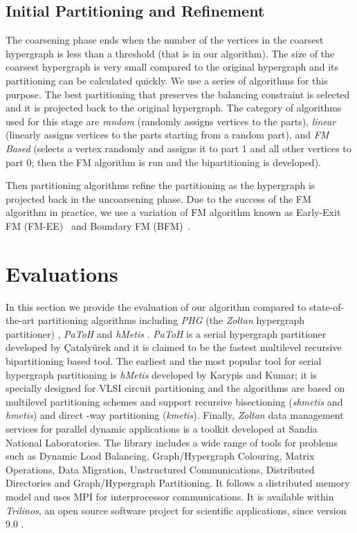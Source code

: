 \documentclass[twocolumn]{svjour3}          \smartqed
\begin{document}
\subsection{Initial Partitioning and Refinement}\label{sec:init_uncoarse}

The coarsening phase ends when the number of the vertices in the coarsest hypergraph is less than a threshold (that is  in our algorithm). The size of the coarsest hypergraph is very small compared to the original hypergraph and its partitioning can be calculated quickly. We use a series of algorithms for this purpose. The best partitioning that preserves the balancing constraint is selected and it is projected back to the original hypergraph. The category of algorithms used for this stage are \textit{random} (randomly assigns vertices to the parts), \textit{linear} (linearly assigns vertices to the parts starting from a random part), and \textit{FM Based} (selects a vertex randomly and assigns it to part 1 and all other vertices to part 0; then the FM algorithm is run and the bipartitioning is developed).

Then partitioning algorithms refine the partitioning as the hypergraph is projected back in the uncoarsening phase. Due to the success of the FM algorithm in practice, we use a variation of FM algorithm known as Early-Exit FM (FM-EE)~\cite{karytech2002} and Boundary FM (BFM)~\cite{ccatalyurek2011patoh}. 


\section{Evaluations}\label{sec:evaluations}

In this section we provide the evaluation of our algorithm compared to state-of-the-art partitioning algorithms including \textit{PHG} (the  \textit{Zoltan} hypergraph partitioner) \cite{devetal2006}, \textit{PaToH} \cite{ccatalyurek2011patoh} and \textit{hMetis} \cite{hmetis15url}. \textit{PaToH} is a serial hypergraph partitioner developed by \c{C}ataly\"{u}rek 
and it is claimed to be the fastest multilevel recursive bipartitioning based tool. The earliest and the most popular tool for serial hypergraph partitioning is \textit{hMetis} developed by Karypis and Kumar; it is specially designed for VLSI circuit partitioning and the algorithms are based on multilevel partitioning schemes and support recursive bisectioning (\textit{shmetis} and  \textit{hmetis}) and direct {-way} partitioning (\textit{kmetis}). Finally, \textit{Zoltan} data management services for parallel dynamic applications is a toolkit developed at Sandia National Laboratories. The library includes a wide range of tools for problems such as Dynamic Load Balancing, Graph/Hypergraph Colouring, Matrix Operations, Data Migration, Unstructured Communications, Distributed Directories and Graph/Hypergraph Partitioning. It follows a distributed memory model and uses MPI for interprocessor communications. It is available within \textit{Trilinos}, an open source software project for scientific applications, since version 9.0 \cite{trilinosurl}.  
\end{document}
